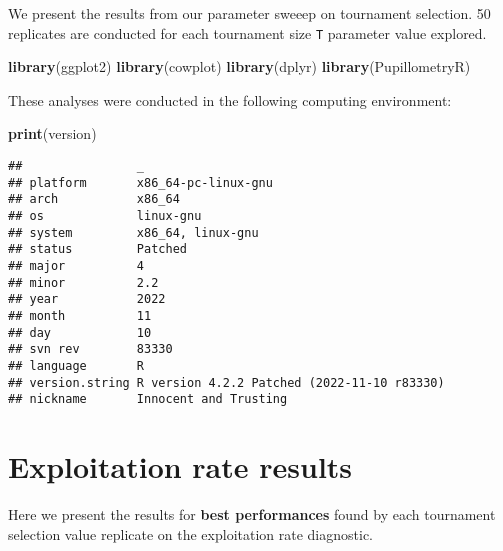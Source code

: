 \documentclass[]{book}
\newenvironment{Shaded}{\begin{snugshade}}{\end{snugshade}}
\newcommand{\KeywordTok}[1]{\textcolor[rgb]{0.13,0.29,0.53}{\textbf{#1}}}
\newcommand{\NormalTok}[1]{#1}
\begin{document}
We present the results from our parameter sweeep on tournament selection.
50 replicates are conducted for each tournament size \texttt{T} parameter value explored.

\begin{Shaded}
\begin{Highlighting}[]
\KeywordTok{library}\NormalTok{(ggplot2)}
\KeywordTok{library}\NormalTok{(cowplot)}
\KeywordTok{library}\NormalTok{(dplyr)}
\KeywordTok{library}\NormalTok{(PupillometryR)}
\end{Highlighting}
\end{Shaded}

These analyses were conducted in the following computing environment:

\begin{Shaded}
\begin{Highlighting}[]
\KeywordTok{print}\NormalTok{(version)}
\end{Highlighting}
\end{Shaded}

\begin{verbatim}
##                _                                          
## platform       x86_64-pc-linux-gnu                        
## arch           x86_64                                     
## os             linux-gnu                                  
## system         x86_64, linux-gnu                          
## status         Patched                                    
## major          4                                          
## minor          2.2                                        
## year           2022                                       
## month          11                                         
## day            10                                         
## svn rev        83330                                      
## language       R                                          
## version.string R version 4.2.2 Patched (2022-11-10 r83330)
## nickname       Innocent and Trusting
\end{verbatim}

\hypertarget{exploitation-rate-results-2}{%
\section{Exploitation rate results}\label{exploitation-rate-results-2}}

Here we present the results for \textbf{best performances} found by each tournament selection value replicate on the exploitation rate diagnostic.
\end{document}
